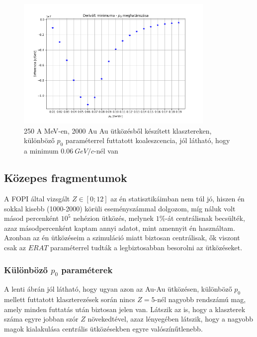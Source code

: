 \documentclass[a4paper,12pt]{article}
\begin{document}
\vspace{5mm}

\begin{figure}[H]
\centering
\includegraphics[width=0.85\textwidth]{./legjobb_p0.png}
\caption{250 A MeV-en, 2000 Au Au ütközésből készített klasztereken, különböző $p_{0}$ paraméterrel futtatott koaleszcencia, jól látható, hogy a minimum $0.06 ~GeV/c$-nél van}
\end{figure}

\subsection{ Közepes fragmentumok}

\vspace{5mm}

\par A FOPI által vizsgált $Z \in [0;12]$ az én statisztikáimban nem túl jó, hiszen én sokkal kisebb (1000-2000) körüli eseményszámmal dolgozom, míg náluk volt másod percenként $10^{5}$ nehézion ütközés, melynek $1\%$-át centrálisnak becsülték, azaz másodpercenként kaptam annyi adatot, mint amennyit én használtam. Azonban az én ütközéseim a szimuláció miatt biztosan centrálisak, ők viszont csak az $ERAT$ paraméterrel tudták a legbiztosabban besorolni az ütközéseket.

\vspace{5mm}

\subsubsection{ Különböző $p_{0}$ paraméterek}

\vspace{5mm}

\par A lenti ábrán jól látható, hogy ugyan azon az Au-Au ütközésen, különböző $p_{0}$ mellett futtatott klaszterezések során nincs $Z = 5$-nél nagyobb rendszámú mag, amely minden futtatás után biztosan jelen van. Látszik az is, hogy a klaszterek száma egyre jobban szór $Z$ növekedtével, azaz lényegében látszik, hogy a nagyobb magok kialakulása centrális ütközésekben egyre valószínűtlenebb.
\end{document}
